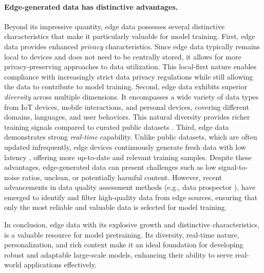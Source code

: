 \paragraph{Edge-generated data has distinctive advantages.} 
Beyond its impressive quantity, edge data possesses several distinctive characteristics that make it particularly valuable for model training.
First, edge data provides enhanced \textit{privacy} characteristics. Since edge data typically remains local to devices and does not need to be centrally stored, it allows for more privacy-preserving approaches to data utilization. This local-first nature enables compliance with increasingly strict data privacy regulations while still allowing the data to contribute to model training.
Second, edge data exhibits superior \textit{diversity} across multiple dimensions. It encompasses a wide variety of data types from IoT devices, mobile interactions, and personal devices, covering different domains, languages, and user behaviors. This natural diversity provides richer training signals compared to curated public datasets \cite{nayak2024review}. 
Third, edge data demonstrates strong \textit{real-time} capability. Unlike public datasets, which are often updated infrequently, edge devices continuously generate fresh data with low latency \cite{cavliwireless_edgecomputing}, offering more up-to-date and relevant training samples.
Despite these advantages, edge-generated data can present challenges such as low signal-to-noise ratios, unclean, or potentially harmful content. However, recent advancements in data quality assessment methods (e.g., data prospector \cite{ni2024small}), have emerged to identify and filter high-quality data from edge sources, ensuring that only the most reliable and valuable data is selected for model training.

In conclusion, edge data with its explosive growth and distinctive characteristics, is a valuable resource for model pretraining. Its diversity, real-time nature, personalization, and rich context make it an ideal foundation for developing robust and adaptable large-scale models, enhancing their ability to serve real-world applications effectively.

